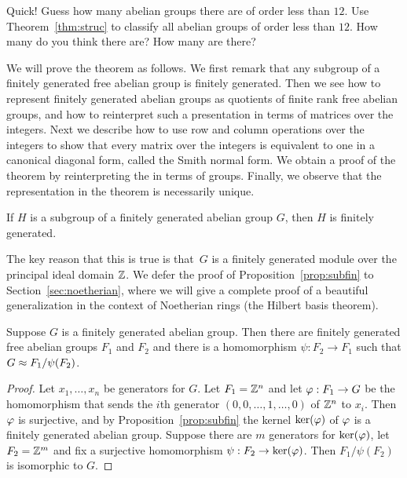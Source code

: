\begin{exercise}
	Quick! Guess how many abelian groups there are of order less than $12$.
	Use Theorem~\ref{thm:struc} to classify all abelian groups of order
	less than $12$. How many do you think there are? How many are there?
\end{exercise}

We will prove the theorem as follows.  We first remark that any
subgroup of a finitely generated free abelian group is finitely
generated.  Then we see how to represent finitely generated abelian groups
as quotients of finite rank free abelian groups, and how to
reinterpret such a presentation in terms of matrices over the
integers.  Next we describe how to use row and column operations over
the integers to show that every matrix over the integers is equivalent
to one in a canonical diagonal form, called the Smith normal form.  We
obtain a proof of the theorem by reinterpreting the  in
terms of groups.  Finally, we observe that
the representation in the theorem is necessarily unique.

\begin{proposition}\label{prop:subfin}
	If $H$ is a subgroup of a finitely generated abelian group $G$,
	then $H$ is finitely generated.
\end{proposition}
The key reason that this is true is that~$G$ is a finitely generated
module over the principal ideal domain $\mathbb{Z}$.  We defer the
proof of Proposition~\ref{prop:subfin} to Section~\ref{sec:noetherian},
where we will give a complete proof of a beautiful generalization
in the context of Noetherian rings (the Hilbert basis theorem).

\begin{corollary}
	\label{cor:presentation}
	Suppose $G$ is a finitely generated abelian group. Then there are
	finitely generated free abelian groups $F_1$ and $F_2$ and there is
	a homomorphism $\psi:F_2 \to F_1$ such that $G \approx F_1/\psi(F_2)$.
\end{corollary}
\begin{proof}
	Let $x_1,\ldots, x_n$ be generators for $G$. Let $F_1=\mathbb{Z}^n$ and let
	$\varphi:F_1\to G$ be the homomorphism that sends the $i$th generator
	$(0,0,\ldots,1,\ldots,0)$ of $\mathbb{Z}^n$ to $x_i$. Then $\varphi$ is
	surjective, and by Proposition~\ref{prop:subfin} the
	kernel $\ker(\varphi)$ of $\varphi$ is a finitely generated abelian
	group. Suppose there are $m$ generators for $\ker(\varphi)$, let
	$F_2 = \mathbb{Z}^m$ and fix a surjective homomorphism $\psi:F_2
	\to \ker(\varphi)$. Then $F_1 / \psi(F_2)$ is isomorphic to $G$.
\end{proof}

